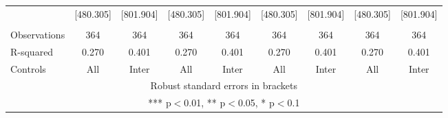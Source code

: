 \begin{tabular}{lcccccccc}
 & [480.305] & [801.904] & [480.305] & [801.904] & [480.305] & [801.904] & [480.305] & [801.904] \\
 &  &  &  &  &  &  &  &  \\
Observations & 364 & 364 & 364 & 364 & 364 & 364 & 364 & 364 \\
R-squared & 0.270 & 0.401 & 0.270 & 0.401 & 0.270 & 0.401 & 0.270 & 0.401 \\
 Controls & All & Inter & All & Inter & All & Inter & All & Inter \\ \hline
\multicolumn{9}{c}{ Robust standard errors in brackets} \\
\multicolumn{9}{c}{ *** p$<$0.01, ** p$<$0.05, * p$<$0.1} \\
\end{tabular}
